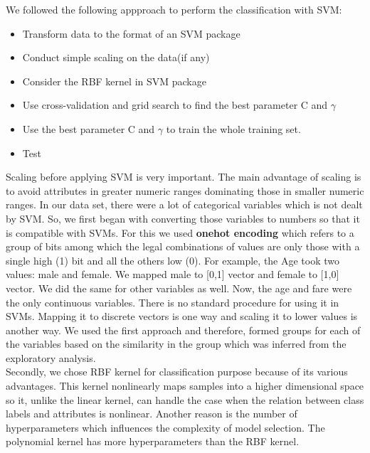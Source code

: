 We followed the following appproach to perform the classification with SVM:
\begin{itemize}

\item Transform data to the format of an SVM package

\item Conduct simple scaling on the data(if any)

\item Consider the RBF kernel in SVM package

\item Use cross-validation and grid search to find the best parameter C and $\gamma$

\item Use the best parameter C and $\gamma$ to train the whole training set.

\item Test
\end{itemize}

Scaling before applying SVM is very important. The main advantage of scaling is to avoid attributes in greater numeric ranges dominating those in smaller numeric ranges. In our data set, there were a lot of categorical variables which is not dealt by SVM. So, we first began with converting those variables to numbers so that it is compatible with SVMs. For this we used \textbf{onehot encoding} which refers to a group of bits among which the legal combinations of values are only those with a single high (1) bit and all the others low (0). For example, the Age took two values: male and female. We mapped male to [0,1] vector and female to [1,0] vector. We did the same for other variables as well. Now, the age and fare were the only continuous variables. There is no standard procedure for using it in SVMs. Mapping it to discrete vectors is one way and scaling it to lower values is another way. We used the first approach and therefore, formed groups for each of the variables based on the similarity in the group which was inferred from the exploratory analysis. \\

Secondly, we chose RBF kernel for classification purpose because of its various advantages. This kernel nonlinearly maps samples into a higher dimensional space so it, unlike the linear kernel, can handle the case when the relation between class labels and attributes is nonlinear. Another reason is the number of hyperparameters which influences the complexity
of model selection. The polynomial kernel has more hyperparameters than the RBF kernel.

